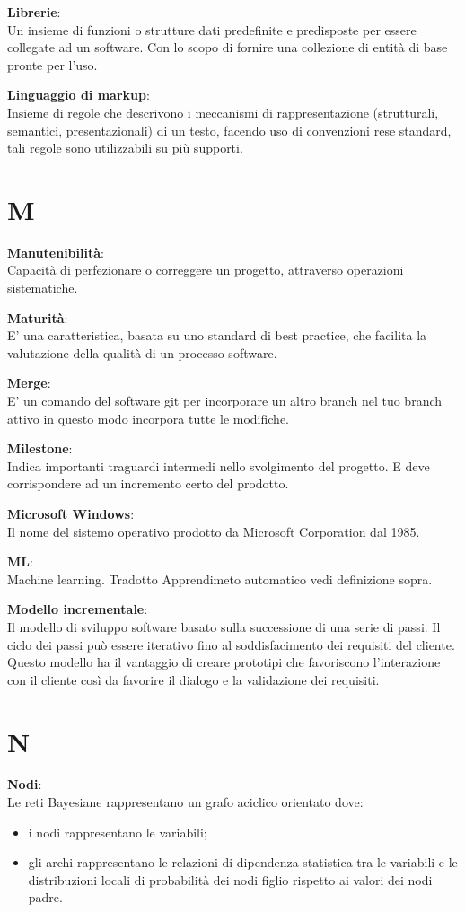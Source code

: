 \documentclass[a4paper, oneside, openany, dvipsnames, table]{article}
\begin{document}
\textbf{Librerie}:\\	Un insieme di funzioni o strutture dati predefinite e predisposte per essere collegate ad un software. Con lo scopo di fornire una collezione di entità di base pronte per l'uso.

\textbf{Linguaggio di markup}:\\	 Insieme di regole che descrivono i meccanismi di rappresentazione (strutturali, semantici, presentazionali) di un testo, facendo uso di convenzioni rese standard, tali regole sono utilizzabili su più supporti.

\newpage
\section{M}
\textbf{Manutenibilità}:\\	Capacità di perfezionare o correggere un progetto, attraverso operazioni sistematiche.

\textbf{Maturità}:\\	E' una caratteristica, basata su uno standard di best practice, che facilita la valutazione della qualità di un processo software. 

\textbf{Merge}:\\	E' un comando del software git per incorporare un altro branch nel tuo branch attivo in questo modo incorpora tutte le modifiche.

\textbf{Milestone}:\\	Indica importanti traguardi intermedi nello svolgimento del progetto. E deve corrispondere ad un incremento certo del prodotto.

\textbf{Microsoft Windows}:\\ Il nome del sistemo operativo prodotto da Microsoft Corporation dal 1985.

\textbf{ML}:\\	Machine learning. Tradotto Apprendimeto automatico vedi definizione sopra.

\textbf{Modello incrementale}:\\	Il modello di sviluppo software basato sulla successione di una serie di passi. Il ciclo dei passi può essere iterativo fino al soddisfacimento dei requisiti del cliente. Questo modello ha il vantaggio di creare prototipi che favoriscono l’interazione con il cliente così da favorire il dialogo e la validazione dei requisiti.


\newpage
\section{N}
\textbf{Nodi}:\\	Le reti Bayesiane rappresentano un grafo aciclico orientato dove:
\begin{itemize}
\item i nodi rappresentano le variabili;
\item gli archi rappresentano le relazioni di dipendenza statistica tra le variabili e le distribuzioni locali di probabilità dei nodi figlio rispetto ai valori dei nodi padre.
\end{itemize}
\end{document}
